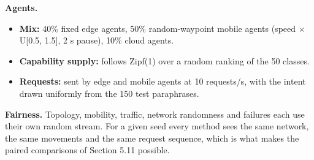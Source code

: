 \documentclass[journal]{IEEEtran}
\begin{document}
\textbf{Agents.}

\begin{itemize}
\item \textbf{Mix:} 40\% fixed edge agents, 50\% random-waypoint mobile agents (speed $\times$ U[0.5, 1.5], 2 s pause), 10\% cloud agents.
\item \textbf{Capability supply:} follows Zipf(1) over a random ranking of the 50 classes.
\item \textbf{Requests:} sent by edge and mobile agents at 10 requests/s, with the intent drawn uniformly from the 150 test paraphrases.
\end{itemize}

\textbf{Fairness.} Topology, mobility, traffic, network randomness and failures each use their own random stream. For a given seed every method sees the same network, the same movements and the same request sequence, which is what makes the paired comparisons of Section 5.11 possible.
\end{document}
